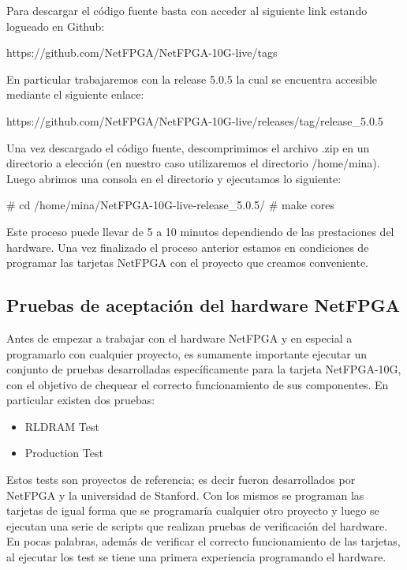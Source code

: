 Para descargar el código fuente basta con acceder al siguiente link estando logueado en Github:

\begin{center}
https://github.com/NetFPGA/NetFPGA-10G-live/tags
\end{center}

En particular trabajaremos con la release 5.0.5 la cual se encuentra accesible mediante el siguiente enlace:
 
\begin{center}
https://github.com/NetFPGA/NetFPGA-10G-live/releases/tag/release\_5.0.5
\end{center}

Una vez descargado el código fuente, descomprimimos el archivo .zip en un directorio a elección (en nuestro caso utilizaremos el directorio /home/mina). Luego abrimos una consola en el directorio y ejecutamos lo siguiente:

\begin{bash}
# cd /home/mina/NetFPGA-10G-live-release_5.0.5/
# make cores
\end{bash}

Este proceso puede llevar de 5 a 10 minutos dependiendo de las prestaciones del hardware. Una vez finalizado el proceso anterior estamos en condiciones de programar las tarjetas NetFPGA con el proyecto que creamos conveniente.

\subsection{Pruebas de aceptación del hardware NetFPGA}
Antes de empezar a trabajar con el hardware NetFPGA y en especial a programarlo con cualquier proyecto, es sumamente importante ejecutar un conjunto de pruebas desarrolladas específicamente para la tarjeta NetFPGA-10G, con el objetivo de chequear el correcto funcionamiento de sus componentes. En particular existen dos pruebas:

\begin{itemize}
\item RLDRAM Test\citep{NetFPGA5}
\item Production Test\citep{NetFPGA7}
\end{itemize}

Estos tests son proyectos de referencia; es decir fueron desarrollados por NetFPGA y la universidad de Stanford. Con los mismos se programan las tarjetas de igual forma que se programaría cualquier otro proyecto y luego se ejecutan una serie de scripts que realizan pruebas de verificación del hardware. En pocas palabras, además de verificar el correcto funcionamiento de las tarjetas, al ejecutar los test se tiene una primera experiencia programando el hardware.\\

